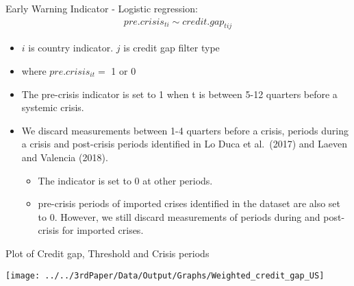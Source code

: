 \documentclass[
  ignorenonframetext,
]{beamer}
\providecommand{\tightlist}{%
  \setlength{\itemsep}{0pt}\setlength{\parskip}{0pt}}
\begin{document}
\begin{frame}{Early Warning Indicator - Logistic regression:}
\protect\hypertarget{early-warning-indicator---logistic-regression}{}
\begin{align}
  pre.crisis_{ti} \sim credit.gap_{tij}
\end{align}

\begin{itemize}
\item
  \(i\) is country indicator. \(j\) is credit gap filter type
\item
  where \(pre.crisis_{it}=\) 1 or 0
\item
  The pre-crisis indicator is set to 1 when t is between 5-12 quarters
  before a systemic crisis.
\item
  We discard measurements between 1-4 quarters before a crisis, periods
  during a crisis and post-crisis periods identified in Lo Duca et
  al.~(2017) and Laeven and Valencia (2018).

  \begin{itemize}
  \tightlist
  \item
    The indicator is set to 0 at other periods.
  \item
    pre-crisis periods of imported crises identified in the dataset are
    also set to 0. However, we still discard measurements of periods
    during and post-crisis for imported crises.
  \end{itemize}
\end{itemize}
\end{frame}

\begin{frame}{Plot of Credit gap, Threshold and Crisis periods}
\protect\hypertarget{plot-of-credit-gap-threshold-and-crisis-periods}{}
\begin{center}\texttt{[image: ../../3rdPaper/Data/Output/Graphs/Weighted\_credit\_gap\_US]} \end{center}
\end{frame}
\end{document}
